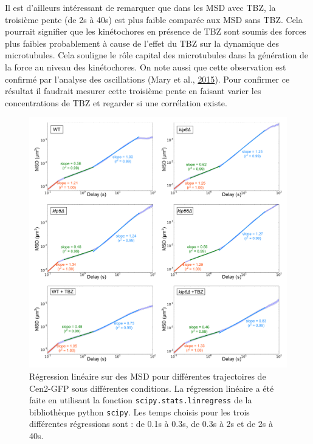 \documentclass[12pt,a4paper,twoside,openright]{book}
\begin{document}
Il est d'ailleurs intéressant de remarquer que dans les MSD avec TBZ, la
troisième pente (de 2s à 40s) est plus faible comparée aux MSD sans TBZ.
Cela pourrait signifier que les kinétochores en présence de TBZ sont
soumis des forces plus faibles probablement à cause de l'effet du TBZ
sur la dynamique des microtubules. Cela souligne le rôle capital des
microtubules dans la génération de la force au niveau des kinétochores.
On note aussi que cette observation est confirmé par l'analyse des
oscillations (Mary et al., \hyperref[ref-Mary2015]{2015}). Pour
confirmer ce résultat il faudrait mesurer cette troisième pente en
faisant varier les concentrations de TBZ et regarder si une corrélation
existe.

\begin{figure}[htbp]
\centering
\includegraphics{figures/results/imaging/msds_log_fit.png}
\caption[Régression linéaire sur des MSD pour différentes trajectoires de Cen2-GFP sous différentes conditions]{\label{fig:msds-log-fit}Régression
linéaire sur des MSD pour différentes trajectoires de Cen2-GFP sous
différentes conditions. La régression linéaire a été faite en utilisant
la fonction \texttt{scipy.stats.linregress} de la bibliothèque python
\texttt{scipy}. Les temps choisis pour les trois différentes régressions
sont : de 0.1s à 0.3s, de 0.3s à 2s et de 2s à 40s.}
\end{figure}
\end{document}
